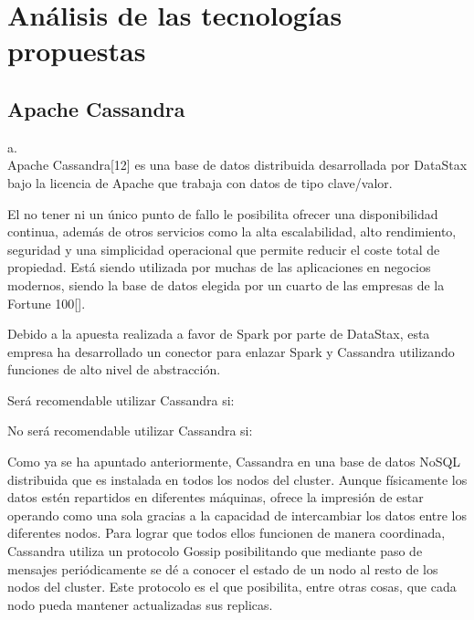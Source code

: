 
\pagestyle{fancy}

\chapter{Análisis de las tecnologías propuestas}
\label{introduccion}

\section{Apache Cassandra}

a.\\

Apache Cassandra[12] es una base de datos distribuida desarrollada por DataStax bajo la licencia de Apache que trabaja con datos de tipo clave/valor.

El no tener ni un único punto de fallo le posibilita ofrecer una disponibilidad continua, además de otros servicios como la alta escalabilidad, alto rendimiento, seguridad y una simplicidad operacional que permite reducir el coste total de propiedad. Está siendo utilizada por muchas de las aplicaciones en negocios modernos, siendo la base de datos elegida por un cuarto de las empresas de la Fortune 100[].

Debido a la apuesta realizada a favor de Spark por parte de DataStax, esta empresa ha desarrollado un conector para enlazar Spark y Cassandra utilizando funciones de alto nivel de abstracción.

Será recomendable utilizar Cassandra si:
%

No será recomendable utilizar Cassandra si:


Como ya se ha apuntado anteriormente, Cassandra en una base de datos NoSQL distribuida que es instalada en todos los nodos del cluster. Aunque físicamente los datos estén repartidos en diferentes máquinas, ofrece la impresión de estar operando como una sola gracias a la capacidad de intercambiar los datos entre los diferentes nodos. Para lograr que todos ellos funcionen de manera coordinada, Cassandra utiliza un protocolo Gossip posibilitando que mediante paso de mensajes periódicamente se dé a conocer el estado de un nodo al resto de los nodos del cluster. Este protocolo es el que posibilita, entre otras cosas, que cada nodo pueda mantener actualizadas sus replicas.

